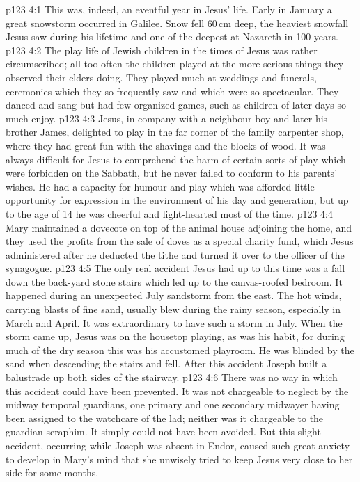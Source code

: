 \vs p123 4:1 This was, indeed, an eventful year in Jesus’ life. Early in January a great snowstorm occurred in Galilee. Snow fell 60\,cm deep, the heaviest snowfall Jesus saw during his lifetime and one of the deepest at Nazareth in 100 years.
\vs p123 4:2 The play life of Jewish children in the times of Jesus was rather circumscribed; all too often the children played at the more serious things they observed their elders doing. They played much at weddings and funerals, ceremonies which they so frequently saw and which were so spectacular. They danced and sang but had few organized games, such as children of later days so much enjoy.
\vs p123 4:3 Jesus, in company with a neighbour boy and later his brother James, delighted to play in the far corner of the family carpenter shop, where they had great fun with the shavings and the blocks of wood. It was always difficult for Jesus to comprehend the harm of certain sorts of play which were forbidden on the Sabbath, but he never failed to conform to his parents’ wishes. He had a capacity for humour and play which was afforded little opportunity for expression in the environment of his day and generation, but up to the age of 14 he was cheerful and light\hyp{}hearted most of the time.
\vs p123 4:4 Mary maintained a dovecote on top of the animal house adjoining the home, and they used the profits from the sale of doves as a special charity fund, which Jesus administered after he deducted the tithe and turned it over to the officer of the synagogue.
\vs p123 4:5 \pc The only real accident Jesus had up to this time was a fall down the back\hyp{}yard stone stairs which led up to the canvas\hyp{}roofed bedroom. It happened during an unexpected July sandstorm from the east. The hot winds, carrying blasts of fine sand, usually blew during the rainy season, especially in March and April. It was extraordinary to have such a storm in July. When the storm came up, Jesus was on the housetop playing, as was his habit, for during much of the dry season this was his accustomed playroom. He was blinded by the sand when descending the stairs and fell. After this accident Joseph built a balustrade up both sides of the stairway.
\vs p123 4:6 There was no way in which this accident could have been prevented. It was not chargeable to neglect by the midway temporal guardians, one primary and one secondary midwayer having been assigned to the watchcare of the lad; neither was it chargeable to the guardian seraphim. It simply could not have been avoided. But this slight accident, occurring while Joseph was absent in Endor, caused such great anxiety to develop in Mary’s mind that she unwisely tried to keep Jesus very close to her side for some months.
